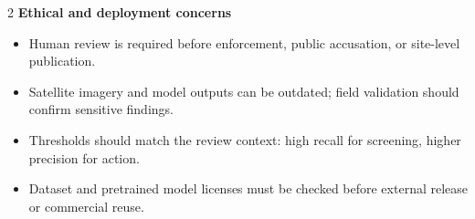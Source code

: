 \documentclass[9pt]{article}
\begin{document}
\begin{multicols}{2}
\textbf{Ethical and deployment concerns}\\[-0.2em]
\begin{itemize}
  \item Human review is required before enforcement, public accusation, or site-level publication.
  \item Satellite imagery and model outputs can be outdated; field validation should confirm sensitive findings.
  \item Thresholds should match the review context: high recall for screening, higher precision for action.
  \item Dataset and pretrained model licenses must be checked before external release or commercial reuse.
\end{itemize}
\end{multicols}
\end{document}
